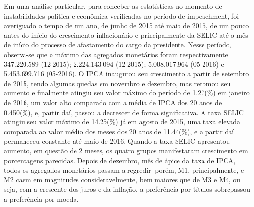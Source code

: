 \documentclass[12pt]{article}
\begin{document}
Em uma análise particular, para conceber as estatísticas no momento de instabilidades política e econômica verificadas no período de impeachment, foi averiguado o tempo de um ano, de junho de 2015 até maio de 2016, de um pouco antes do início do crescimento inflacionário e principalmente da SELIC até o mês de início do processo de afastamento do cargo da presidente. Nesse período, observa-se que o máximo das agregados monetários foram respectivamente: 347.220.589 (12-2015); 2.224.143.094 (12-2015); 5.008.017.964 (05-2016) e 5.453.699.716 (05-2016). O IPCA inaugurou seu crescimento a partir de setembro de 2015, tendo algumas quedas em novembro e dezembro, mas retomou seu aumento e finalmente atingiu seu valor máximo do período de 1.27(\%) em janeiro de 2016, um valor alto comparado com a média de IPCA dos 20 anos de 0.450(\%), e, partir daí, passou a decrescer de forma significativa. A taxa SELIC atingiu seu valor máximo de 14.25(\%) já em agosto de 2015, uma taxa elevada comparada ao valor médio dos meses dos 20 anos de 11.44(\%), e a partir daí permaneceu constante até maio de 2016. Quando a taxa SELIC apresentou aumento, em questão de 2 meses, os quatro grupos manifestaram crescimento em porcentagens parecidas. Depois de dezembro, mês de ápice da taxa de IPCA, todos os agregados monetários passam a regredir, porém, M1, principalmente, e M2 caem em magnitudes consideravelmente, bem maiores que de M3 e M4, ou seja, com a crescente dos juros e da inflação, a preferência por títulos sobrepassou a preferência por moeda. 
\end{document}
